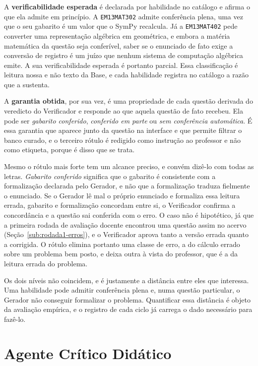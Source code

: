 A \textbf{verificabilidade esperada} é declarada por habilidade no catálogo e afirma o que ela
admite em princípio. A \texttt{EM13MAT302} admite conferência plena, uma vez que o seu gabarito é um
valor que o SymPy recalcula. Já a \texttt{EM13MAT402} pede converter uma representação algébrica em
geométrica, e embora a matéria matemática da questão seja conferível, saber se o enunciado de fato
exige a conversão de registro é um juízo que nenhum sistema de computação algébrica emite. A sua
verificabilidade esperada é portanto parcial. Essa classificação é leitura nossa e não texto da
Base, e cada habilidade registra no catálogo a razão que a sustenta.

A \textbf{garantia obtida}, por sua vez, é uma propriedade de cada questão derivada do veredicto
do Verificador e responde ao que aquela questão de fato recebeu. Ela pode ser \emph{gabarito
conferido}, \emph{conferido em parte} ou \emph{sem conferência automática}. É essa garantia que
aparece junto da questão na interface e que permite filtrar o banco curado, e o terceiro rótulo é
redigido como instrução ao professor e não como etiqueta, porque é disso que se trata.

Mesmo o rótulo mais forte tem um alcance preciso, e convém dizê-lo com todas as letras.
\emph{Gabarito conferido} significa que o gabarito é consistente com a formalização declarada pelo
Gerador, e não que a formalização traduza fielmente o enunciado. Se o Gerador lê mal o próprio
enunciado e formaliza essa leitura errada, gabarito e formalização concordam entre si, o
Verificador confirma a concordância e a questão sai conferida com o erro. O caso não é hipotético,
já que a primeira rodada de avaliação docente encontrou uma questão assim no acervo
(Seção~\ref{sub:rodada1-erros}), e o Verificador aprova tanto a versão errada quanto a
corrigida. O rótulo elimina portanto uma classe de erro, a do cálculo errado sobre um problema bem
posto, e deixa outra à vista do professor, que é a da leitura errada do problema.

Os dois níveis não coincidem, e é justamente a distância entre eles que interessa. Uma habilidade
pode admitir conferência plena e, numa questão particular, o Gerador não conseguir formalizar o
problema. Quantificar essa distância é objeto da avaliação empírica, e o registro de cada ciclo já
carrega o dado necessário para fazê-lo.

\section{Agente Crítico Didático}
\label{sec:ag-critico}

